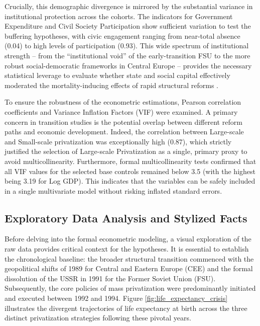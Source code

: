 \documentclass[12pt]{article}
\begin{document}
Crucially, this demographic divergence is mirrored by the substantial variance in institutional protection across the cohorts. The indicators for Government 
Expenditure and Civil Society Participation show sufficient variation to test the buffering hypotheses, with civic engagement ranging from near-total absence 
(0.04) to high levels of participation (0.93). This wide spectrum of institutional strength -- from the ``institutional void'' of the early-transition FSU to 
the more robust social-democratic frameworks in Central Europe -- provides the necessary statistical leverage to evaluate whether state and social capital 
effectively moderated the mortality-inducing effects of rapid structural reforms \citep{Cornia2016, Hamm2012}.

To ensure the robustness of the econometric estimations, Pearson correlation coefficients and Variance Inflation Factors (VIF) were examined. A primary 
concern in transition studies is the potential overlap between different reform paths and economic development. Indeed, the correlation between Large-scale 
and Small-scale privatization was exceptionally high (0.87), which strictly justified the selection of Large-scale Privatization as a single, primary proxy 
to avoid multicollinearity. Furthermore, formal multicollinearity tests confirmed that all VIF values for the selected base controls remained below 3.5 (with 
the highest being 3.19 for Log GDP). This indicates that the variables can be safely included in a single multivariate model without risking inflated standard 
errors.

\subsection{Exploratory Data Analysis and Stylized Facts}

Before delving into the formal econometric modeling, a visual exploration of the raw data provides critical context for the hypotheses. It is essential to establish 
the chronological baseline: the broader structural transition commenced with the geopolitical shifts of 1989 for Central and Eastern Europe (CEE) and the formal 
dissolution of the USSR in 1991 for the Former Soviet Union (FSU). Subsequently, the core policies of mass privatization were predominantly initiated and executed 
between 1992 and 1994. Figure \ref{fig:life_expectancy_crisis} illustrates the divergent trajectories of life expectancy at birth across the three distinct privatization 
strategies following these pivotal years.
\end{document}
